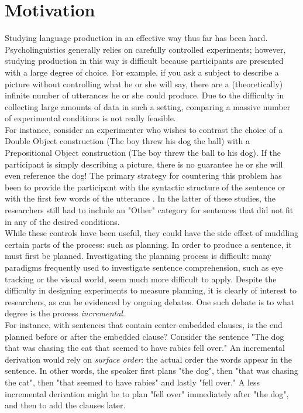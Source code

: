 \documentclass[11pt]{article}
\begin{document}
\section{Motivation}
Studying language production in an effective way thus far has been hard. Psycholinguistics generally relies on carefully controlled experiments; however, studying production in this way is difficult because participants are presented with a large degree of choice. For example, if you ask a subject to describe a picture without controlling what he or she will say, there are a (theoretically) infinite number of utterances he or she could produce. Due to the difficulty in collecting large amounts of data in such a setting, comparing a massive number of experimental conditions is not really feasible. \\
\indent For instance, consider an experimenter who wishes to contrast the choice of a Double Object construction (The boy threw his dog the ball) with a Prepositional Object construction (The boy threw the ball to his dog). If the participant is simply describing a picture, there is no guarantee he or she will even reference the dog! The primary strategy for countering this problem has been to provide the participant with the syntactic structure of the sentence \citep{incremental} or with the first few words of the utterance \citep{chinese-representation}. In the latter of these studies, the researchers still had to include an "Other" category for sentences that did not fit in any of the desired conditions. \\
\indent While these controls have been useful, they could have the side effect of muddling certain parts of the process: such as planning. In order to produce a sentence, it must first be planned. Investigating the planning process is difficult: many paradigms frequently used to investigate sentence comprehension, such as eye tracking or the visual world, seem much more difficult to apply. Despite the difficulty in designing experiments to measure planning, it is clearly of interest to researchers, as can be evidenced by ongoing debates. One such debate is to what degree is the process \emph{incremental}. \\
\indent For instance, with sentences that contain center-embedded clauses, is the end planned before or after the embedded clause? Consider the sentence "The dog that was chasing the cat that seemed to have rabies fell over." An incremental derivation would rely on \emph{surface order}: the actual order the words appear in the sentence. In other words, the speaker first plans "the dog", then "that was chasing the cat", then "that seemed to have rabies" and lastly "fell over." A less incremental derivation might be to plan "fell over" immediately after "the dog", and then to add the clauses later. \\
\end{document}
